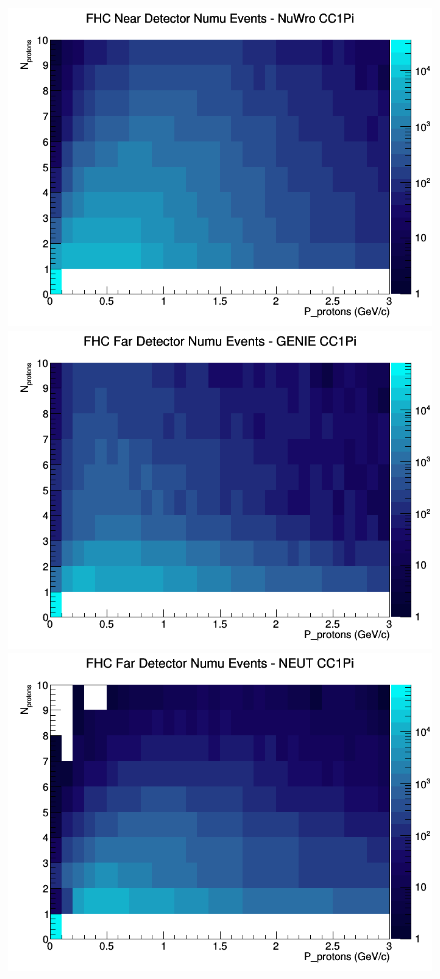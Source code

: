 \begin{figure}[h]
\includegraphics[width=\linewidth]{N_P/nominal/protons/CC1Pi_FHC_ND_numu_N_P_NuWro.png}
\endminipage
\newline
{}
\includegraphics[width=\linewidth]{N_P/nominal/protons/CC1Pi_FHC_FD_numu_N_P_GENIE.png}
\endminipage
{}
\includegraphics[width=\linewidth]{N_P/nominal/protons/CC1Pi_FHC_FD_numu_N_P_NEUT.png}

\end{figure}
